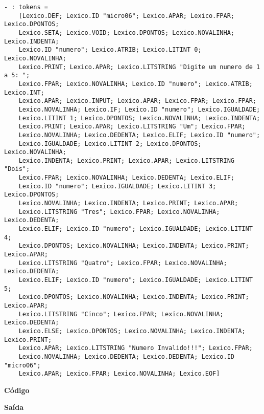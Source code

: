 \documentclass[hidelinks,12pt]{article}
\begin{document}
	\begin{lstlisting}[caption=Analisador Léxico]
	- : tokens =
	[Lexico.DEF; Lexico.ID "micro06"; Lexico.APAR; Lexico.FPAR; Lexico.DPONTOS;
	Lexico.SETA; Lexico.VOID; Lexico.DPONTOS; Lexico.NOVALINHA; Lexico.INDENTA;
	Lexico.ID "numero"; Lexico.ATRIB; Lexico.LITINT 0; Lexico.NOVALINHA;
	Lexico.PRINT; Lexico.APAR; Lexico.LITSTRING "Digite um numero de 1 a 5: ";
	Lexico.FPAR; Lexico.NOVALINHA; Lexico.ID "numero"; Lexico.ATRIB; Lexico.INT;
	Lexico.APAR; Lexico.INPUT; Lexico.APAR; Lexico.FPAR; Lexico.FPAR;
	Lexico.NOVALINHA; Lexico.IF; Lexico.ID "numero"; Lexico.IGUALDADE;
	Lexico.LITINT 1; Lexico.DPONTOS; Lexico.NOVALINHA; Lexico.INDENTA;
	Lexico.PRINT; Lexico.APAR; Lexico.LITSTRING "Um"; Lexico.FPAR;
	Lexico.NOVALINHA; Lexico.DEDENTA; Lexico.ELIF; Lexico.ID "numero";
	Lexico.IGUALDADE; Lexico.LITINT 2; Lexico.DPONTOS; Lexico.NOVALINHA;
	Lexico.INDENTA; Lexico.PRINT; Lexico.APAR; Lexico.LITSTRING "Dois";
	Lexico.FPAR; Lexico.NOVALINHA; Lexico.DEDENTA; Lexico.ELIF;
	Lexico.ID "numero"; Lexico.IGUALDADE; Lexico.LITINT 3; Lexico.DPONTOS;
	Lexico.NOVALINHA; Lexico.INDENTA; Lexico.PRINT; Lexico.APAR;
	Lexico.LITSTRING "Tres"; Lexico.FPAR; Lexico.NOVALINHA; Lexico.DEDENTA;
	Lexico.ELIF; Lexico.ID "numero"; Lexico.IGUALDADE; Lexico.LITINT 4;
	Lexico.DPONTOS; Lexico.NOVALINHA; Lexico.INDENTA; Lexico.PRINT; Lexico.APAR;
	Lexico.LITSTRING "Quatro"; Lexico.FPAR; Lexico.NOVALINHA; Lexico.DEDENTA;
	Lexico.ELIF; Lexico.ID "numero"; Lexico.IGUALDADE; Lexico.LITINT 5;
	Lexico.DPONTOS; Lexico.NOVALINHA; Lexico.INDENTA; Lexico.PRINT; Lexico.APAR;
	Lexico.LITSTRING "Cinco"; Lexico.FPAR; Lexico.NOVALINHA; Lexico.DEDENTA;
	Lexico.ELSE; Lexico.DPONTOS; Lexico.NOVALINHA; Lexico.INDENTA; Lexico.PRINT;
	Lexico.APAR; Lexico.LITSTRING "Numero Invalido!!!"; Lexico.FPAR;
	Lexico.NOVALINHA; Lexico.DEDENTA; Lexico.DEDENTA; Lexico.ID "micro06";
	Lexico.APAR; Lexico.FPAR; Lexico.NOVALINHA; Lexico.EOF]
	\end{lstlisting}
	
	
	{\large \textbf{Código} }
			
	
	{\large \textbf{Saída}}
	
\end{document}
